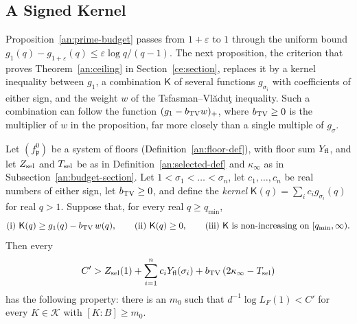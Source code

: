 \subsection{A Signed Kernel}\label{an:signed-section}
Proposition~\ref{an:prime-budget} passes from $1+\varepsilon$ to $1$ through
the uniform bound $g_1(q)-g_{1+\varepsilon}(q)\le\varepsilon\log q/(q-1)$.
The next proposition, the criterion that proves Theorem~\ref{an:ceiling} in
Section~\ref{ce:section}, replaces it by a kernel inequality between $g_1$,
a combination $\mathsf K$ of several functions $g_{\sigma_i}$ with
coefficients of either sign, and the weight $w$ of the
Tsfasman--Vl\u{a}du\c{t} inequality. Such a combination can follow the
function $(g_1-b_{\rm TV}w)_+$, where $b_{\rm TV}\ge0$ is the multiplier of
$w$ in the proposition, far more closely than a single multiple of
$g_\sigma$.

\begin{proposition}\label{an:signed}
Let $(f^0_{\mathfrak p})$ be a system of floors (Definition~\ref{an:floor-def}),
with floor sum $Y_{\rm fl}$, and let $Z_{\rm sel}$ and $T_{\rm sel}$ be as in
Definition~\ref{an:selected-def} and $\kappa_\infty$ as in
Subsection~\ref{an:budget-section}.
Let $1<\sigma_1<\dots<\sigma_n$, let $c_1,\dots,c_n$ be real numbers of
either sign, let $b_{\rm TV}\ge0$, and define the \emph{kernel}
$\mathsf K(q)=\sum_ic_ig_{\sigma_i}(q)$ for real $q>1$. Suppose that, for
every real $q\ge q_{\min}$,
\[
 \text{(i) }\mathsf K(q)\ge g_1(q)-b_{\rm TV}\,w(q),\qquad
 \text{(ii) }\mathsf K(q)\ge0,\qquad
 \text{(iii) }\mathsf K\text{ is non-increasing on }[q_{\min},\infty).
\]
Then every
\[
 C'>Z_{\rm sel}(1)+\sum_{i=1}^nc_iY_{\rm fl}(\sigma_i)
 +b_{\rm TV}\,(2\kappa_\infty-T_{\rm sel})
\]
has the following property: there is an $m_0$ such that
$d^{-1}\log L_F(1)<C'$ for every $K\in\mathcal K$ with $[K:B]\ge m_0$.
\end{proposition}

